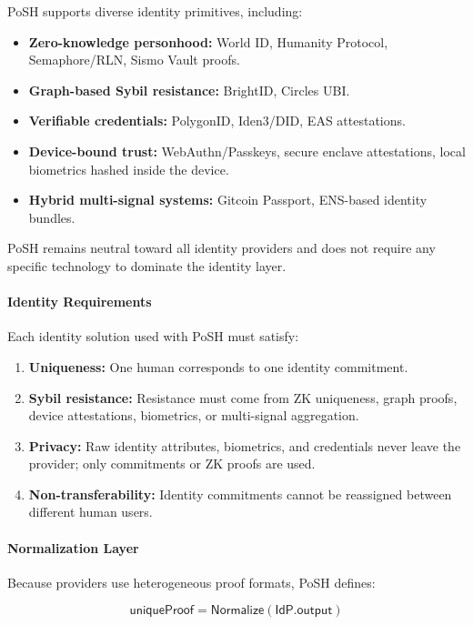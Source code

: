 \documentclass{article}
\begin{document}
PoSH supports diverse identity primitives, including:

\begin{itemize}
\item \textbf{Zero-knowledge personhood:} World ID, Humanity Protocol,
Semaphore/RLN, Sismo Vault proofs.
\item \textbf{Graph-based Sybil resistance:} BrightID, Circles UBI.
\item \textbf{Verifiable credentials:} PolygonID, Iden3/DID, EAS attestations.
\item \textbf{Device-bound trust:} WebAuthn/Passkeys, secure enclave
attestations, local biometrics hashed inside the device.
\item \textbf{Hybrid multi-signal systems:} Gitcoin Passport, ENS-based
identity bundles.
\end{itemize}

PoSH remains neutral toward all identity providers and does not require any
specific technology to dominate the identity layer.

\paragraph{Identity Requirements}

Each identity solution used with PoSH must satisfy:

\begin{enumerate}
\item \textbf{Uniqueness:} One human corresponds to one identity commitment.
\item \textbf{Sybil resistance:} Resistance must come from ZK uniqueness,
graph proofs, device attestations, biometrics, or multi-signal
aggregation.
\item \textbf{Privacy:} Raw identity attributes, biometrics, and credentials
never leave the provider; only commitments or ZK proofs are used.
\item \textbf{Non-transferability:} Identity commitments cannot be reassigned
between different human users.
\end{enumerate}

\paragraph{Normalization Layer}

Because providers use heterogeneous proof formats, PoSH defines:

\begin{equation}
\mathsf{uniqueProof} = \textsf{Normalize}(\textsf{IdP.output})
\end{equation}
\end{document}
